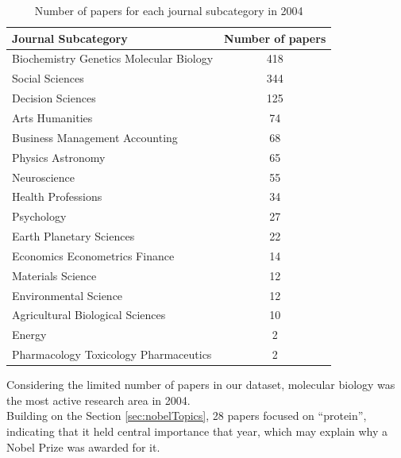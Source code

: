 \documentclass{article}
\begin{document}
\begin{table}[H]
	\centering
	\caption{Number of papers for each journal subcategory in 2004}
	\begin{tabular}{|l|c|}
		\hline
		\textbf{Journal Subcategory}            & \textbf{Number of papers} \\ \hline
		Biochemistry Genetics Molecular Biology & 418                       \\ \hline
		Social Sciences                         & 344                       \\ \hline
		Decision Sciences                       & 125                       \\ \hline
		Arts Humanities                         & 74                        \\ \hline
		Business Management Accounting          & 68                        \\ \hline
		Physics Astronomy                       & 65                        \\ \hline
		Neuroscience                            & 55                        \\ \hline
		Health Professions                      & 34                        \\ \hline
		Psychology                              & 27                        \\ \hline
		Earth Planetary Sciences                & 22                        \\ \hline
		Economics Econometrics Finance          & 14                        \\ \hline
		Materials Science                       & 12                        \\ \hline
		Environmental Science                   & 12                        \\ \hline
		Agricultural Biological Sciences        & 10                        \\ \hline
		Energy                                  & 2                         \\ \hline
		Pharmacology Toxicology Pharmaceutics   & 2                         \\ \hline
	\end{tabular}
	\label{tab:papersPerSubcategoryPerYear}
\end{table}
Considering the limited number of papers in our dataset, molecular biology
was the most active research area in 2004.\\
Building on the Section \ref{sec:nobelTopics}, 28 papers
focused on ``protein'', indicating that it held central importance that year,
which may explain why a Nobel Prize was awarded for it.
\end{document}
